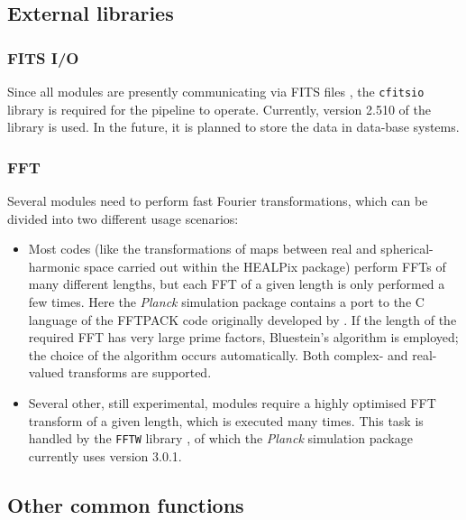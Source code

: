 \documentclass{aa}
\begin{document}
\subsection {External libraries}
\subsubsection {FITS I/O}

Since all modules are presently communicating via FITS files
\citep{fits-1999}, the {\tt cfitsio} library \citep{pence-1999} is
required for the pipeline to operate. Currently, version 2.510 of the
library is used. In the future, it is planned to store the data in
data-base systems.

\subsubsection {FFT}

Several modules need to perform fast Fourier transformations, which can
be divided into two different usage scenarios:

\begin{itemize}

  \item Most codes (like the transformations of maps between real and
    spherical-harmonic space carried out within the HEALPix package)
    perform FFTs of many different lengths, but each FFT of a given
    length is only performed a few times. Here the
    \emph{Planck} simulation package contains a port to the C language
    of the FFTPACK code originally developed by
    \cite{swarztrauber-1982}. If the length of the required FFT has
    very large prime factors, Bluestein's algorithm
    \citep{bluestein-1968} is employed; the choice of the algorithm
    occurs automatically.
    Both complex- and real-valued transforms are supported.

  \item Several other, still experimental, modules require a highly
    optimised FFT transform of a given length, which is executed many
    times. This task is handled by the {\tt FFTW} library
    \citep{frigo-johnson-1998}, of which the \emph{Planck} simulation
    package currently uses version 3.0.1.

\end {itemize}

\subsection {Other common functions}
\end{document}
